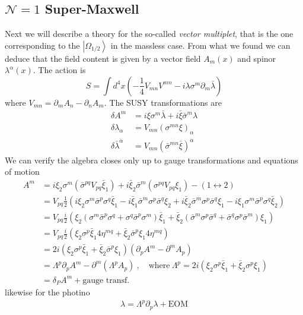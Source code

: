 \documentclass[a4paper,12pt]{article}
\numberwithin{equation}{section}
\numberwithin{exe}{section}
\newcommand{\p}{{\partial}}
\newcommand{\lra}{\leftrightarrow}
\renewcommand{\a}{{\alpha}}
\newcommand{\ad}{{\dot\alpha}}
\renewcommand{\d}{{\delta}}
\renewcommand{\l}{{\lambda}}
\newcommand{\lb}{{\bar\lambda}}
\renewcommand{\L}{{\Lambda}}
\newcommand{\s}{{\sigma}}
\renewcommand{\sb}{{\bar\sigma}}
\newcommand{\xib}{{\bar\xi}}
\begin{document}
\subsection{$\mathcal N=1$ Super-Maxwell}
Next we will describe a theory for the so-called {\it vector multiplet}, that is the one corresponding to the $\left|\Omega_{1/2}\right>$ in the massless case. From what we found we can deduce that the field content is given by a vector field $A_m(x)$ and spinor $\l^\a(x)$. The action is
	\begin{equation}
	S = \int d^4 x\left(-\frac14 V_{mn} V^{mn} - i\l\s^m\p_m\lb\right)
	\end{equation}
where $V_{mn} = \p_m A_n - \p_n A_m$. The SUSY transformations are
	\begin{equation}
		\begin{aligned}
		\d A^m & = i\xi\s^m\lb + i\xib\sb^m\l \\
		\d \l_\a & = V_{mn}(\s^{mn}\xi)_\a \\
		\d \lb^\ad & = V_{mn}(\sb^{mn}\xib)^\ad
		\end{aligned}
	\end{equation}
We can verify the algebra closes only up to gauge transformations and equations of motion
	\begin{align}
	[\d_1,\d_2]A^m & = i\xi_2\s^m(\sb^{pq} V_{pq}\xib_1) + i\xib_2 \sb^m(\s^{pq}V_{pq}\xi_1) - (1\lra 2) \nonumber \\
	& = V_{pq}\frac12 (i\xi_2\s^m\sb^p\s^q\xib_1 - i\xib_1\sb^m\s^p\sb^q\xi_2 + i\xib_2\sb^m \s^p\sb^q\xi_1 - i\xi_1\s^m\sb^p\s^q\xib_2) \nonumber \\
	& = V_{pq}\frac{i}{2}(\xi_2(\s^m\sb^p\s^q + \s^q\sb^p\s^m)\xib_1 + \xib_2 (\sb^m\s^p\sb^q + \sb^q\s^p\sb^m)\xi_1) \nonumber \\
	& = V_{pq}\frac{i}{2}(\xi_2\s^p\xib_1 4\eta^{mq} + \xib_2\sb^p\xi_1 4\eta^{mq}) \nonumber \\
	& = 2i(\xi_2\s^p\xib_1 + \xib_2\sb^p \xi_1)(\p_p A^m - \p^m A_p) \nonumber \\
	& = \L^p\p_p A^m - \p^m(\L^p A_p)\ ,\quad\text{where}\ \L^p = 2i(\xi_2\s^p\xib_1 + \xib_2\s^p\xi_1) \nonumber \\
	& = \d_P A^m + \text{gauge transf.}
	\end{align}
likewise for the photino
	\begin{align}
	[\d_1, \d_2]\l = \L^p\p_p \l + \text{EOM}
	\end{align}
\end{document}
